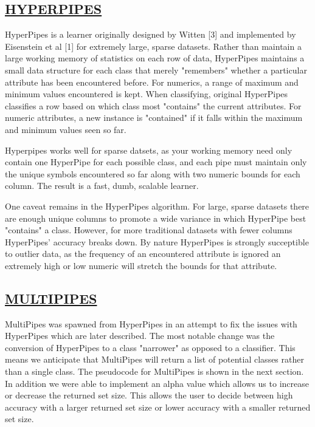 \begin{kasten}
  \section*{ \hspace{0.1cm} {\color{red} \underline{HYPERPIPES}}}
\large{
HyperPipes is a learner originally designed by Witten [3] and implemented by Eisenstein et al [1] for extremely large, sparse datasets. Rather than maintain a large working memory of statistics on each row of data, HyperPipes maintains a small data structure for each class that merely "remembers" whether a particular attribute has been encountered before. For numerics, a range of maximum and minimum values encountered is kept. When classifying, original HyperPipes classifies a row based on which class most "contains" the current attributes. For numeric attributes, a new instance is "contained" if it falls within the maximum and minimum values seen so far.

\vspace{3 mm}

Hyperpipes works well for sparse datsets, as your working memory need only contain one HyperPipe for each possible class, and each pipe must maintain only the unique symbols encountered so far along with two numeric bounds for each column. The result is a fast, dumb, scalable learner.

\vspace{3 mm}

One caveat remains in the HyperPipes algorithm. For large, sparse datasets there are enough unique columns to promote a wide variance in which HyperPipe best "contains" a class. However, for more traditional datasets with fewer columns HyperPipes' accuracy breaks down. By nature HyperPipes is strongly succeptible to outlier data, as the frequency of an encountered attribute is ignored an extremely high or low numeric will stretch the bounds for that attribute.

}
\end{kasten}

\begin{kasten}
    \section*{ \hspace{0.1cm} {\color{red} \underline{MULTIPIPES}}}
    \large{
MultiPipes was spawned from HyperPipes in an attempt to fix the issues with HyperPipes which are later described. The most notable change was the conversion of HyperPipes to a class "narrower" as opposed to a classifier. This means we anticipate that MultiPipes will return a list of potential classes rather than a single class. The pseudocode for MultiPipes is shown in the next section. In addition we were able to implement an alpha value which allows us to increase or decrease the returned set size. This allows the user to decide between high accuracy with a larger returned set size or lower accuracy with a smaller returned set size.
}
\end{kasten}
